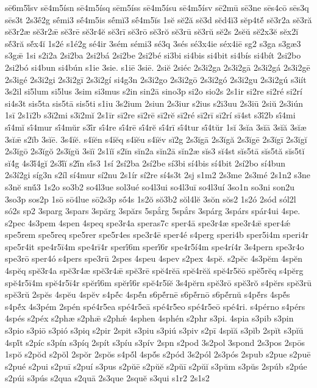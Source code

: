 {sē6m5ĭ́sv
sē4m5ísn
sē4m5ísq
sēm5íss
sē4m5ísu
sē4m5ísv
sē2mū
sē3ne
sēs4cō
sēs3q
sēs3t
2s3ḗ2g
sḗmi3
sḗ4m5is
sḗmĭ3
sḗ4m5ĭs
1sĕ
sĕ2ă
sĕ3d
sĕd4ĭ3
sĕp4tĕ́
sĕ3r2a
sĕ3ră
sĕ3r2æ
sĕ3r2ǣ
sĕ3rē
sĕ3r4ĕ
sĕ3rī
sĕ3rō
sĕ3rŏ
sĕ3rū
sĕ3rŭ
sĕ2s
2sĕŭ
sĕ2x3ĕ
sĕx2ĭ
sĕ́3ră
sĕ́x4ĭ
1s2é
s1é2g
sé4ir
3sém
sémi3
sé3q
3sés
sé3x4ie
séx4iē
sg2
s3ga
s3gæ3
s3gǣ
1si
s2i2a
2si2ba
2si2bá
2si2be
2si2bé
si3bi
si4bis
si4bit
si4bís
si4bít
2si2bo
2si2bó
si4bun
si4bún
s1ie
3sie.
s1iē
3siē.
2siĕ
2siéc
2s3i2ga
2s3i2gā
2s3i2gá
2s3i2gē
2s3igé
2s3i2gi
2s3i2gī
2s3i2gí
si4g3n
2s3i2go
2s3i2gō
2s3i2gó
2s3i2gu
2s3i2gú
s3iít
3s2il
si5lum
si5lus
3sim
si3mus
s2in
sin2ā
sino3p
si2o
sio2s
2s1ir
si2re
si2ré
si2rí
si4s3t
sis5ta
sis5tā
sis5ti
s1iu
3s2ium
2siun
2s3iur
s2ius
s2i3uu
2s3iū
2siŭ
2s3iún
1sī
2s1ī2b
s3ī2mi
s3ī2mĭ
2s1īr
sī2re
sī2rē
sī2rĕ
sī2ré
sī2rī
sī2rí
sī4st
s3ī́2b
sī́4mi
sī́4mĭ
sī́4mur
sī́4mŭr
s3ī́r
sī́4re
sī́4rē
sī́4rĕ
sī́4rī
sī́4tur
sī́4tŭr
1sĭ
3sĭa
3sĭā
3sĭă
3sĭæ
3sĭǣ
s2ĭb
3sĭē.
3s4ĭĕ.
s4ĭĕn
s4ĭĕq
s4ĭĕu
s4ĭĕv
sĭ2g
2s3ĭgā
2s3ĭgă
2s3ĭgē
2s3ĭgī
2s3ĭgĭ
2s3ĭgō
2s3ĭgŏ
2s3ĭgŭ
3sĭī
2s1ĭĭ
s2ĭn
sĭn2a
sĭn2ā
sĭn2æ
sĭs3
sĭ4st
sĭs5tā
sĭs5tă
sĭs5tĭ
sĭ4́g
4s3ĭ́4gĭ
2s3ĭ́ĭ
s2ĭ́n
sĭ́s3
1sí
2sí2ba
2sí2be
sí3bi
sí4bis
sí4bit
2sí2bo
sí4bun
2s3í2gi
síg3n
s2íl
sí4mur
sí2nu
2s1ír
sí2re
sí4s3t
2sj
s1m2
2s3me
2s3mé
2s1n2
s3ne
s3nĕ
snŭ́3
1s2o
so3b2
so4l3ue
sol3ué
so4l3ui
so4l3uī
so4l3uí
3so1n
so3ni
son2u
3so3p
sos2p
1sō
sō4lue
sō2s3p
sṓ4s
1s2ŏ
sŏ3b2
sŏl4lĕ
3sŏn
sŏs2
1s2ó
2sód
sól2l
só2s
sp2
3sparg
3spars
3spărg
3spărs
5spắrg
5spắrs
3spárg
3spárs
spár4ui
4spe.
s2pec
4s3pem
4spen
4speq
spe3r4a
speras7c
sper4ā
spe3r4æ
spe3r4ǣ
sper4ǽ
spe5rem
spe5req
spe5rer
spe5r4es
spe3r4ē
sper4é
s4perg
speri4b
sper5i4m
speri4r
spe5r4it
spe4r5ī4m
spe4rī4r
sperī́6m
sperī́6r
spe4r5í4m
spe4rí4r
3s4pern
spe3r4o
spe3rō
sper4ó
s4pers
spe3rū
2spes
4speu
4spev
s2pex
4spĕ.
s2pĕc
4s3pĕm
4spĕn
4spĕq
spĕ3r4a
spĕ3r4æ
spĕ3r4ǣ
spĕ3rē
spĕ4rĕā
spĕ4rĕă
spĕ4r5ĕō
spĕ5rĕq
s4pĕrg
spĕ4r5ī4m
spĕ4r5ī4r
spĕrī́6m
spĕrī́6r
spĕ4r5ĭĕ
3s4pĕrn
spĕ3rō
spĕ3rŏ
s4pĕrs
spĕ3rū
spĕ3rŭ
2spĕs
4spĕu
4spĕv
s4pĕ́c
4spĕ́n
s6pĕ́rnē
s6pĕ́rnō
s6pĕ́rnŭ
s4pĕ́rs
4spĕ́s
s4pĕ́x
4s3pém
2spén
spé4r5ea
spé4r5eā
spé4r5eo
spé4r5eō
spé4ri.
s4pérno
s4pérs
4spés
s2péx
s2phæ
s2phǣ
s2phǽ
4sphen
4sphén
s2phr
s3pi.
4spia
s3pib
s3pin
s3pio
s3piō
s3pió
s3piq
s2pir
2spit
s3piu
s3piú
s3piv
s2pī
4spĭă
s3pĭb
2spĭt
s3pĭŭ
4spĭ́t
s2píc
s3pín
s3píq
2spít
s3píu
s3pív
2spn
s2pod
3s2pol
3spond
2s3pos
2spōs
1spŏ
s2pŏd
s2pŏl
2spŏr
2spŏs
s4pŏ́l
4spŏ́s
s2pód
3s2pól
2s3pós
2spub
s2pue
s2puē
s2pué
s2pui
s2puī
s2puí
s3pus
s2pŭē
s2pŭĕ
s2pŭī
s2pŭĭ
s3pŭm
s3pŭs
2spúb
s2púe
s2púi
s3pús
s2qua
s2quā
2s3que
2squĕ
s3qui
s1r2
2s1s2
}
